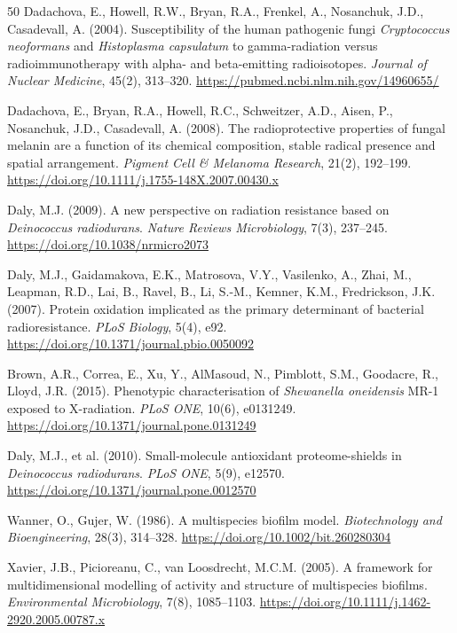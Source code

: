 \documentclass[11pt]{article}
\begin{document}
\begin{thebibliography}{50}
Dadachova, E., Howell, R.W., Bryan, R.A., Frenkel, A., Nosanchuk, J.D., Casadevall, A. (2004).
Susceptibility of the human pathogenic fungi \textit{Cryptococcus neoformans} and
\textit{Histoplasma capsulatum} to gamma-radiation versus radioimmunotherapy with alpha-
and beta-emitting radioisotopes.
\textit{Journal of Nuclear Medicine}, 45(2), 313--320.
\url{https://pubmed.ncbi.nlm.nih.gov/14960655/}

Dadachova, E., Bryan, R.A., Howell, R.C., Schweitzer, A.D., Aisen, P., Nosanchuk, J.D., Casadevall, A. (2008).
The radioprotective properties of fungal melanin are a function of its chemical composition,
stable radical presence and spatial arrangement.
\textit{Pigment Cell \& Melanoma Research}, 21(2), 192--199.
\url{https://doi.org/10.1111/j.1755-148X.2007.00430.x}

Daly, M.J. (2009).
A new perspective on radiation resistance based on \textit{Deinococcus radiodurans}.
\textit{Nature Reviews Microbiology}, 7(3), 237--245.
\url{https://doi.org/10.1038/nrmicro2073}

Daly, M.J., Gaidamakova, E.K., Matrosova, V.Y., Vasilenko, A., Zhai, M., Leapman, R.D., Lai, B.,
Ravel, B., Li, S.-M., Kemner, K.M., Fredrickson, J.K. (2007).
Protein oxidation implicated as the primary determinant of bacterial radioresistance.
\textit{PLoS Biology}, 5(4), e92.
\url{https://doi.org/10.1371/journal.pbio.0050092}

Brown, A.R., Correa, E., Xu, Y., AlMasoud, N., Pimblott, S.M., Goodacre, R., Lloyd, J.R. (2015).
Phenotypic characterisation of \textit{Shewanella oneidensis} MR-1 exposed to X-radiation.
\textit{PLoS ONE}, 10(6), e0131249.
\url{https://doi.org/10.1371/journal.pone.0131249}

Daly, M.J., et al. (2010).
Small-molecule antioxidant proteome-shields in \textit{Deinococcus radiodurans}.
\textit{PLoS ONE}, 5(9), e12570.
\url{https://doi.org/10.1371/journal.pone.0012570}

Wanner, O., Gujer, W. (1986).
A multispecies biofilm model.
\textit{Biotechnology and Bioengineering}, 28(3), 314--328.
\url{https://doi.org/10.1002/bit.260280304}

Xavier, J.B., Picioreanu, C., van Loosdrecht, M.C.M. (2005).
A framework for multidimensional modelling of activity and structure of multispecies biofilms.
\textit{Environmental Microbiology}, 7(8), 1085--1103.
\url{https://doi.org/10.1111/j.1462-2920.2005.00787.x}


\end{thebibliography}
\end{document}
